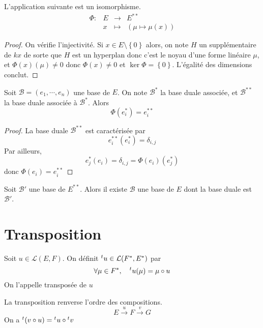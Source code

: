\begin{thm}
L'application suivante est un isomorphisme. \[
\begin{array}{rrcl}
    \Phi:& E & \longrightarrow & E^{**} \\
         & x & \longmapsto & \displaystyle (\mu \longmapsto \mu(x))
\end{array}
\] 
\end{thm}

\begin{proof}
    On vérifie l'injectivité. Si $x \in  E \setminus  \left\{ 0 \right\} $ alors, on note $H$ un supplémentaire de  $kx$ de sorte que  $H$ est un hyperplan donc c'est le noyau d'une forme linéaire  $\mu$, et  $\Phi(x)(\mu)\neq 0$ donc  $\Phi(x) \neq 0$ et $\ker \Phi = \left\{ 0 \right\} $. L'égalité des dimensions conclut.
\end{proof}

\begin{prop}
    Soit $\mathcal  B = (e_1, \cdots , e_n)$ une base de $E$. On note  $\mathcal  B^*$ la base duale associée, et $\mathcal  B^{**}$ la base duale associée à $\mathcal  B^{*}$. Alors \[
        \Phi(e_i^*)=e_i^{**}
    \] 
\end{prop}

\begin{proof}
La base duale $\mathcal  B^{**}$ est caractérisée par \[
    e_i^{**}(e_i^*)=\delta_{i,j}
\] 
Par ailleurs, \[
    e_j^*(e_i)=\delta_{i,j}=\Phi(e_i)(e_j^*)
\] 
donc $\Phi(e_i)=e_i^{**}$
\end{proof}

\begin{cor}
Soit $\mathcal  B'$ une base de $E^{**}$. Alors il existe $ \mathcal  B$ une base de $E$ dont la base duale est  $\mathcal  B'$.
\end{cor}

\section{Transposition}

\begin{dfn}
    Soit $u \in  \mathcal  L(E, F)$. On définit ${}^t u \in  \mathcal  L(F^*, E^*)$ par \[
        \forall  \mu \in  F^*, \quad  {}^t u(\mu)=\mu\circ u
    \]
    On l'appelle transposée de $u$
\end{dfn}

\begin{rem}
    La transposition renverse l'ordre des compositions. \[
        E \xrightarrow{u}F \xrightarrow{v}G
    \]
    On a ${}^t(v\circ u)={}^t u\circ {}^t v$
\end{rem}

